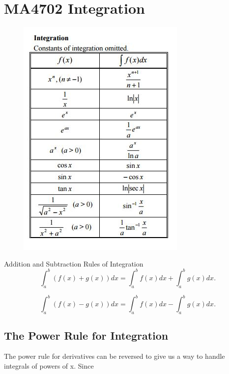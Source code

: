 \documentclass[]{article}
\begin{document}
\newpage
\section*{MA4702 Integration}


\begin{figure}[h!]
	\centering
	\includegraphics[width=0.55\linewidth]{integrationtabless}
\end{figure}



%


Addition and Subtraction Rules of Integration
\[\int_a^b (f(x) + g(x)) dx = \int_a^b f(x) dx + \int_a^b g(x) dx.\]

\[\int_a^b (f(x) - g(x)) dx = \int_a^b f(x) dx - \int_a^b g(x) dx.\]


%
%
%
%

\subsection*{The Power Rule for Integration}
The power rule for derivatives can be reversed to give us a way to handle integrals of powers of x. Since
\end{document}
